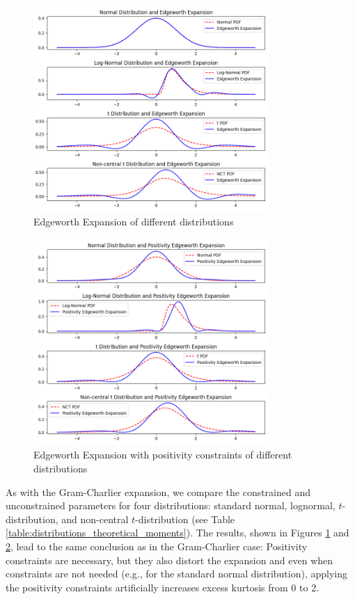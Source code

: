 \begin{figure}[h]
    \centering
    \includegraphics[width=0.8\textwidth]{img/ew_expansion.png}
    \caption{Edgeworth Expansion of different distributions}
    \label{fig:ew_expansion}
\end{figure}

\begin{figure}[h]
    \centering
    \includegraphics[width=0.8\textwidth]{img/ew_positivity_expansion.png}
    \caption{Edgeworth Expansion with positivity constraints of different distributions}
    \label{fig:ew_positivity_expansion}
\end{figure}

As with the Gram-Charlier expansion, we compare the constrained and unconstrained parameters for four distributions: standard normal, lognormal, $t$-distribution, and non-central $t$-distribution (see Table \ref{table:distributions_theoretical_moments}). The results, shown in Figures \ref{fig:ew_expansion} and \ref{fig:ew_positivity_expansion}, lead to the same conclusion as in the Gram-Charlier case: Positivity constraints are necessary, but they also distort the expansion and even when constraints are not needed (e.g., for the standard normal distribution), applying the positivity constraints artificially increases excess kurtosis from 0 to 2.

